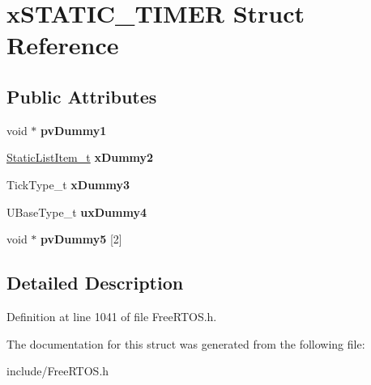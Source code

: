 \hypertarget{structxSTATIC__TIMER}{}\section{x\+S\+T\+A\+T\+I\+C\+\_\+\+T\+I\+M\+ER Struct Reference}
\label{structxSTATIC__TIMER}
\subsection*{Public Attributes}
\begin{DoxyCompactItemize}
\item 
\mbox{\label{structxSTATIC__TIMER_a040499298faced6032f84f3a33c785fd}} 
void $\ast$ {\bfseries pv\+Dummy1}
\item 
\mbox{\label{structxSTATIC__TIMER_a622e2e596e5829c9197bb44b9009474f}} 
\mbox{\hyperlink{structxSTATIC__LIST__ITEM}{Static\+List\+Item\+\_\+t}} {\bfseries x\+Dummy2}
\item 
\mbox{\label{structxSTATIC__TIMER_a60d582d1d0b5b9b15e8050d5ae29bc30}} 
Tick\+Type\+\_\+t {\bfseries x\+Dummy3}
\item 
\mbox{\label{structxSTATIC__TIMER_abe61bde25ac09934004caa0222f4831b}} 
U\+Base\+Type\+\_\+t {\bfseries ux\+Dummy4}
\item 
\mbox{\label{structxSTATIC__TIMER_a9410b4450349079b65e2c25605913cbf}} 
void $\ast$ {\bfseries pv\+Dummy5} \mbox{[}2\mbox{]}
\end{DoxyCompactItemize}


\subsection{Detailed Description}


Definition at line 1041 of file Free\+R\+T\+O\+S.\+h.



The documentation for this struct was generated from the following file\+:\begin{DoxyCompactItemize}
\item 
include/Free\+R\+T\+O\+S.\+h\end{DoxyCompactItemize}
